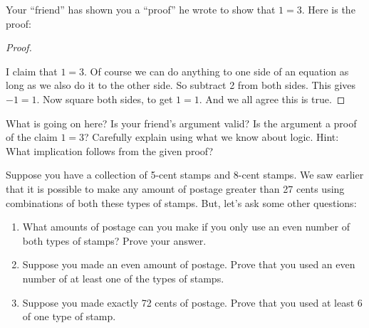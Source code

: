 \documentclass[10pt,]{book}
\theoremstyle{plain}
\theoremstyle{definition}
\theoremstyle{definition}
\theoremstyle{definition}
\theoremstyle{definition}
\numberwithin{equation}{chapter}
\begin{document}
\begin{divisionexercise}{3}\hypertarget{exercise-238}{}
\hypertarget{p-2133}{}%
Your ``friend'' has shown you a ``proof'' he wrote to show that \(1 = 3\). Here is the proof:%
\begin{proof}\hypertarget{proof-31}{}
\hypertarget{p-2134}{}%
I claim that \(1 = 3\). Of course we can do anything to one side of an equation as long as we also do it to the other side. So subtract 2 from both sides. This gives \(-1 = 1\). Now square both sides, to get \(1 = 1\). And we all agree this is true.%
\end{proof}
\hypertarget{p-2135}{}%
What is going on here? Is your friend's argument valid? Is the argument a proof of the claim \(1=3\)? Carefully explain using what we know about logic. Hint: What implication follows from the given proof?%
\end{divisionexercise}%
\begin{divisionexercise}{4}\hypertarget{exercise-239}{}
\hypertarget{p-2136}{}%
Suppose you have a collection of 5-cent stamps and 8-cent stamps. We saw earlier that it is possible to make any amount of postage greater than 27 cents using combinations of both these types of stamps. But, let's ask some other questions: \leavevmode%
\begin{enumerate}[label=(\alph*)]
\item\hypertarget{li-702}{}\hypertarget{p-2137}{}%
What amounts of postage can you make if you only use an even number of both types of stamps? Prove your answer.%
\item\hypertarget{li-703}{}\hypertarget{p-2138}{}%
Suppose you made an even amount of postage. Prove that you used an even number of at least one of the types of stamps.%
\item\hypertarget{li-704}{}\hypertarget{p-2139}{}%
Suppose you made exactly 72 cents of postage. Prove that you used at least 6 of one type of stamp.%
\end{enumerate}
%
\end{divisionexercise}%
\end{document}
